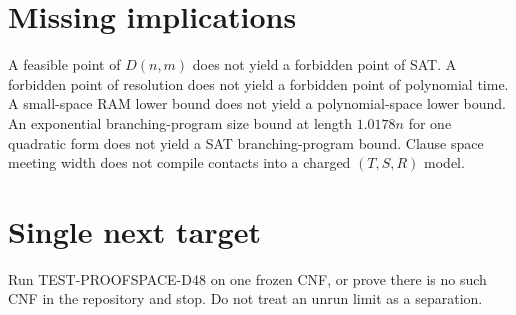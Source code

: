 \documentclass[11pt]{article}
\begin{document}
\section*{Missing implications}
A feasible point of \(D(n,m)\) does not yield a forbidden point of SAT. A forbidden point of resolution does not yield a forbidden point of polynomial time. A small-space RAM lower bound does not yield a polynomial-space lower bound. An exponential branching-program size bound at length \(1.0178n\) for one quadratic form does not yield a SAT branching-program bound. Clause space meeting width does not compile contacts into a charged \((T,S,R)\) model.

\section*{Single next target}
Run TEST-PROOFSPACE-D48 on one frozen CNF, or prove there is no such CNF in the repository and stop. Do not treat an unrun limit as a separation.

\end{document}
